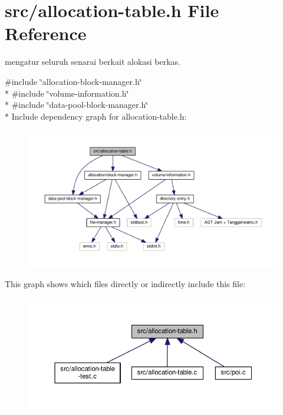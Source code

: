 \hypertarget{allocation-table_8h}{\section{src/allocation-\/table.h File Reference}
\label{allocation-table_8h}
}


mengatur seluruh senarai berkait alokasi berkas.  


{\ttfamily \#include \char`\"{}allocation-\/block-\/manager.\-h\char`\"{}}\\*
{\ttfamily \#include \char`\"{}volume-\/information.\-h\char`\"{}}\\*
{\ttfamily \#include \char`\"{}data-\/pool-\/block-\/manager.\-h\char`\"{}}\\*
Include dependency graph for allocation-\/table.h\-:\nopagebreak
\begin{figure}[H]
\begin{center}
\leavevmode
\includegraphics[width=350pt]{allocation-table_8h__incl}
\end{center}
\end{figure}
This graph shows which files directly or indirectly include this file\-:\nopagebreak
\begin{figure}[H]
\begin{center}
\leavevmode
\includegraphics[width=350pt]{allocation-table_8h__dep__incl}
\end{center}
\end{figure}
